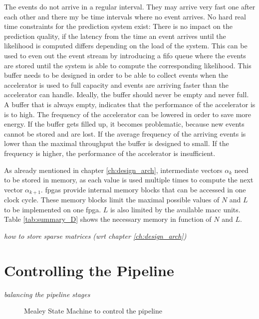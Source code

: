\documentclass[mscthesis]{usiinfthesis}
\begin{document}
The events do not arrive in a regular interval. They may arrive very fast one
after each other and there my be time intervals where no event arrives. No hard
real time constraints for the prediction system exist: There is no impact on
the prediction quality, if the latency from the time an event arrives until the
likelihood is computed differs depending on the load of the system. This can be
used to even out the event stream by introducing a \gls{fifo} queue where the
events are stored until the system is able to compute the corresponding
likelihood.  This buffer needs to be designed in order to be able to collect
events when the accelerator is used to full capacity and events are arriving
faster than the accelerator can handle. Ideally, the buffer should never be
empty and never full. A buffer that is always empty, indicates that the
performance of the accelerator is is to high. The frequency of the accelerator
can be lowered in order to save more energy. If the buffer gets filled up, it
becomes problematic, because new events cannot be stored and are lost. If the
average frequency of the arriving events is lower than the maximal throughput
the buffer is designed to small.  If the frequency is higher, the performance
of the accelerator is insufficient.

As already mentioned in chapter \ref{ch:design_arch}, intermediate vectors
$\alpha_k$ need to be stored in memory, as each value is used multiple times to
compute the next vector $\alpha_{k+1}$. \glspl{fpga} provide internal memory
blocks that can be accessed in one clock cycle. These memory blocks limit the
maximal possible values of $N$ and $L$ to be implemented on one \gls{fpga}. $L$
is also limited by the available \gls{macc} units. Table \ref{tab:summary_D}
shows the necessary memory in function of $N$ and $L$.

\emph{\color{red}how to store sparse matrices (wrt chapter
\ref{ch:design_arch})}

\section{Controlling the Pipeline}
\label{ch:design_ctrl}

\emph{\color{red}balancing the pipeline stages}

\begin{figure}
    \centering
    
    \caption{Mealey State Machine to control the pipeline}
    \label{fig:arch_sm}
\end{figure}
\end{document}
